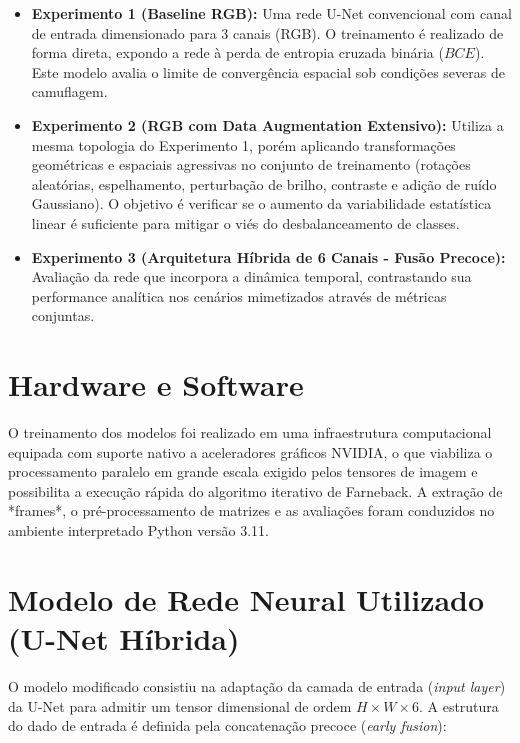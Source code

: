 \begin{itemize}
    \item \textbf{Experimento 1 (Baseline RGB):} Uma rede U-Net convencional \cite{ronneberger2015unet} com canal de entrada dimensionado para $3$ canais (RGB). O treinamento é realizado de forma direta, expondo a rede à perda de entropia cruzada binária ($BCE$). Este modelo avalia o limite de convergência espacial sob condições severas de camuflagem.
    \item \textbf{Experimento 2 (RGB com Data Augmentation Extensivo):} Utiliza a mesma topologia do Experimento 1, porém aplicando transformações geométricas e espaciais agressivas no conjunto de treinamento (rotações aleatórias, espelhamento, perturbação de brilho, contraste e adição de ruído Gaussiano). O objetivo é verificar se o aumento da variabilidade estatística linear é suficiente para mitigar o viés do desbalanceamento de classes.
    \item \textbf{Experimento 3 (Arquitetura Híbrida de 6 Canais - Fusão Precoce):} Avaliação da rede que incorpora a dinâmica temporal, contrastando sua performance analítica nos cenários mimetizados através de métricas conjuntas.
\end{itemize}

\section{Hardware e Software}
\label{sec:hardware_software}

O treinamento dos modelos foi realizado em uma infraestrutura computacional equipada com suporte nativo a aceleradores gráficos NVIDIA, o que viabiliza o processamento paralelo em grande escala exigido pelos tensores de imagem e possibilita a execução rápida do algoritmo iterativo de Farneback. A extração de *frames*, o pré-processamento de matrizes e as avaliações foram conduzidos no ambiente interpretado Python versão 3.11.

\section{Modelo de Rede Neural Utilizado (U-Net Híbrida)}
\label{sec:modelo_unet}

O modelo modificado consistiu na adaptação da camada de entrada (\textit{input layer}) da U-Net para admitir um tensor dimensional de ordem $H \times W \times 6$. A estrutura do dado de entrada é definida pela concatenação precoce (\textit{early fusion}):

